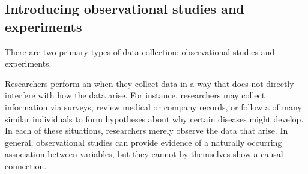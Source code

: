 

\subsection{Introducing observational studies and experiments}

\noindent%
There are two primary types of data collection:
observational studies and experiments.

Researchers perform an  when they
collect data in a way that does not directly interfere with
how the data arise.
For instance, researchers may collect information via surveys,
review medical or company records, or follow a 
of many similar individuals to form hypotheses about why certain
diseases might develop.
In each of these situations, researchers merely observe the
data that arise.
In general, observational studies can provide evidence of
a naturally occurring association between variables, but they
cannot by themselves show a causal connection.

